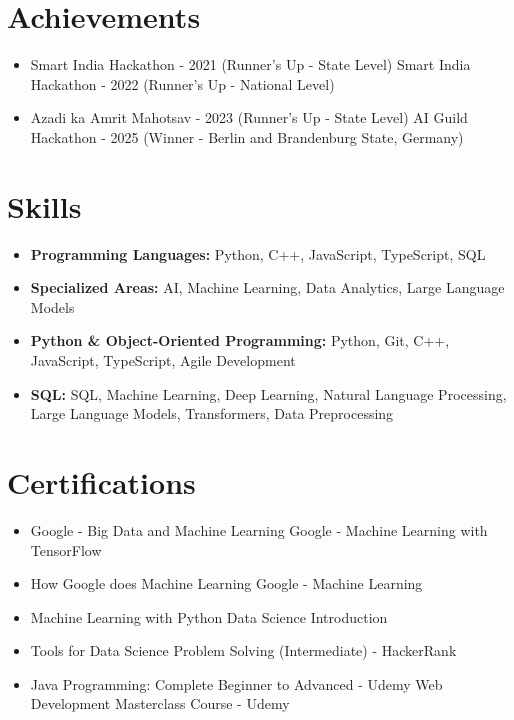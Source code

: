 \documentclass[a4paper,10pt]{article}
\begin{document}
\section*{Achievements}
\begin{itemize}
\item Smart India Hackathon - 2021 (Runner's Up - State Level) \hfill Smart India Hackathon - 2022 (Runner's Up - National Level)
\item Azadi ka Amrit Mahotsav - 2023 (Runner's Up - State Level) \hfill AI Guild Hackathon - 2025 (Winner - Berlin and Brandenburg State, Germany)
\end{itemize}

\section*{Skills}
\begin{itemize}
  \item \textbf{Programming Languages:} Python, C++, JavaScript, TypeScript, SQL
  \item \textbf{Specialized Areas:} AI, Machine Learning, Data Analytics, Large Language Models
  \item \textbf{Python \& Object-Oriented Programming:} Python, Git, C++, JavaScript, TypeScript, Agile Development
  \item \textbf{SQL:} SQL, Machine Learning, Deep Learning, Natural Language Processing, Large Language Models, Transformers, Data Preprocessing
\end{itemize}

\section*{Certifications}
\begin{itemize}
\item Google - Big Data and Machine Learning \hfill Google - Machine Learning with TensorFlow
\item How Google does Machine Learning \hfill Google - Machine Learning
\item Machine Learning with Python \hfill Data Science Introduction
\item Tools for Data Science \hfill Problem Solving (Intermediate) - HackerRank
\item Java Programming: Complete Beginner to Advanced - Udemy \hfill Web Development Masterclass Course - Udemy
\end{itemize}
\end{document}
